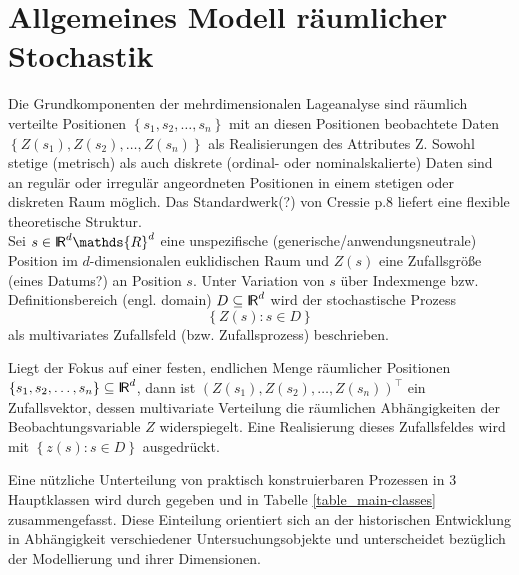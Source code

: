
\section{Allgemeines Modell räumlicher Stochastik}
\label{sec:generalmodel}

Die Grundkomponenten der mehrdimensionalen Lageanalyse sind räumlich verteilte Positionen 
$\left\{ s_1 , s_2 ,\ldots , s_n \right\}$ mit an diesen Positionen beobachtete 
Daten $\left\{ Z(s_1),Z(s_2),\ldots,Z(s_n) \right\}$ als Realisierungen des Attributes Z. 
Sowohl stetige (metrisch) als auch diskrete (ordinal- oder nominalskalierte) Daten sind 
an regulär oder irregulär angeordneten Positionen in einem stetigen oder diskreten Raum möglich. 
Das Standardwerk(?) von Cressie p.8 liefert eine flexible theoretische Struktur. \\

Sei $s \in \RR^d \mathds{R}^d $ eine unspezifische (generische/anwendungsneutrale) Position 
im $d$-dimensionalen euklidischen Raum 
und $Z(s)$ eine Zufallsgröße (eines Datums?) an Position $s$. 
Unter Variation von $s$ über Indexmenge bzw. Definitionsbereich (engl. domain) $D \subseteq {\sf I\kern-0.14emR}^d$ 
wird der stochastische Prozess 
\begin{equation*}
    \left\{ Z(s):s \in D \right\}
\end{equation*}
als multivariates Zufallsfeld (bzw. Zufallsprozess) beschrieben.

Liegt der Fokus auf einer festen, endlichen Menge räumlicher 
Positionen $ \left\{  s_1 , s_2 ,\ldots , s_n \right\} \subseteq {\sf I\kern-0.14emR}^d$, 
dann ist $ \left( Z(s_1),Z(s_2),\ldots,Z(s_n) \right)^{\top} $ ein Zufallsvektor, 
dessen multivariate Verteilung die räumlichen Abhängigkeiten der Beobachtungsvariable $Z$ widerspiegelt. 
Eine Realisierung dieses Zufallsfeldes wird mit $\left\{ z(s):s \in D \right\}$ ausgedrückt.

Eine nützliche Unterteilung von praktisch konstruierbaren Prozessen in 3 Hauptklassen 
wird durch \cite{cressie_statistics_1993} gegeben und in 
Tabelle \ref{table_main-classes} zusammengefasst. 
Diese Einteilung orientiert sich an der historischen 
Entwicklung in Abhängigkeit verschiedener Untersuchungsobjekte und unterscheidet bezüglich 
der Modellierung und ihrer Dimensionen.

